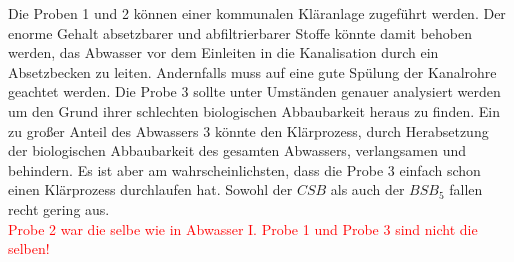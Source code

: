 Die Proben 1 und 2 können einer kommunalen Kläranlage zugeführt werden. Der enorme Gehalt absetzbarer und abfiltrierbarer Stoffe könnte damit behoben werden, das Abwasser vor dem Einleiten in die Kanalisation durch ein Absetzbecken zu leiten. Andernfalls muss auf eine gute Spülung der Kanalrohre geachtet werden. Die Probe 3 sollte unter Umständen genauer analysiert werden um den Grund ihrer schlechten biologischen Abbaubarkeit heraus zu finden. Ein zu großer Anteil des Abwassers 3 könnte den Klärprozess, durch Herabsetzung der biologischen Abbaubarkeit des gesamten Abwassers, verlangsamen und behindern. Es ist aber am wahrscheinlichsten, dass die Probe 3 einfach schon einen Klärprozess durchlaufen hat. Sowohl der $CSB$ als auch der $BSB_5$ fallen recht gering aus. \\

\textcolor{red}{Probe 2 war die selbe wie in Abwasser I. Probe 1 und Probe 3 sind nicht die selben!}


